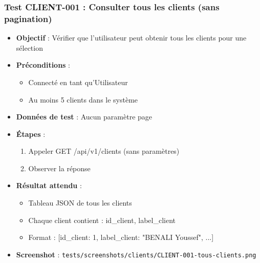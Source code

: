 \subsubsection{Test CLIENT-001 : Consulter tous les clients (sans pagination)}
\begin{itemize}
    \item \textbf{Objectif} : Vérifier que l'utilisateur peut obtenir tous les clients pour une sélection
    \item \textbf{Préconditions} : 
        \begin{itemize}
            \item Connecté en tant qu'Utilisateur
            \item Au moins 5 clients dans le système
        \end{itemize}
    \item \textbf{Données de test} : Aucun paramètre page
    \item \textbf{Étapes} :
        \begin{enumerate}
            \item Appeler GET /api/v1/clients (sans paramètres)
            \item Observer la réponse
        \end{enumerate}
    \item \textbf{Résultat attendu} : 
        \begin{itemize}
            \item Tableau JSON de tous les clients
            \item Chaque client contient : id\_client, label\_client
            \item Format : [{id\_client: 1, label\_client: "BENALI Youssef"}, ...]
        \end{itemize}
    \item \textbf{Screenshot} : \texttt{tests/screenshots/clients/CLIENT-001-tous-clients.png}
\end{itemize}

